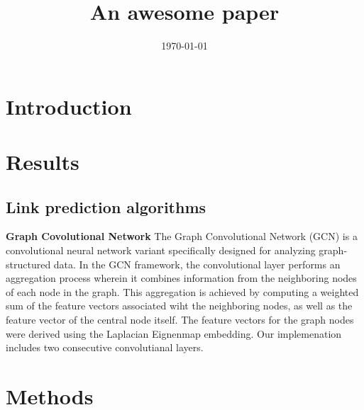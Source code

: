 \documentclass[12pt]{article} %
\begin{document}

\title{An awesome paper} %
\date{\today}
\maketitle %

\section{Introduction}\label{sec:introduction} %



\section{Results}\label{sec:results} %
\subsection{Link prediction algorithms}

\textbf{Graph Covolutional Network} The Graph Convolutional Network (GCN) is a convolutional neural network variant specifically designed for analyzing graph-structured data.
In the GCN framework, the convolutional layer performs an aggregation process wherein it combines information from the neighboring nodes of each node in the graph.
This aggregation is achieved by computing a weighted sum of the feature vectors associated wiht the neighboring nodes, as well as the feature vector of the central node itself.
The feature vectors for the graph nodes were derived using the Laplacian Eignenmap embedding. Our implemenation includes two consecutive convolutianal layers.


\section{Methods}\label{sec:methods} %


\printbibliography{}
    
\end{document}
